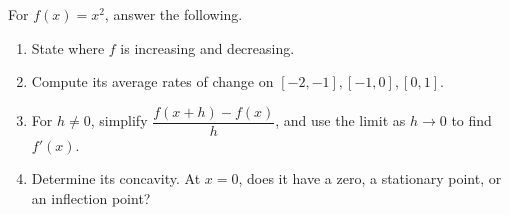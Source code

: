 For $f(x)=x^2$, answer the following.
\begin{enumerate}
\item State where $f$ is increasing and decreasing.
\item Compute its average rates of change on $[-2,-1],[-1,0],[0,1]$.
\item For $h\ne0$, simplify $\dfrac{f(x+h)-f(x)}{h}$, and use the limit as $h\to0$ to find $f'(x)$.
\item Determine its concavity. At $x=0$, does it have a zero, a stationary point, or an inflection point?
\end{enumerate}
